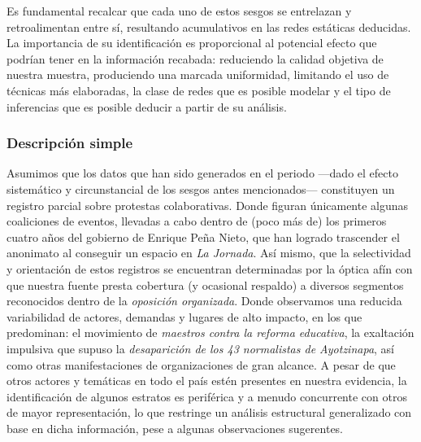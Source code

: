 \documentclass[letterpaper, 11pt]{book}
\theoremstyle{definition}
\theoremstyle{remark}
\begin{document}
Es fundamental recalcar que cada uno de estos sesgos se entrelazan y retroalimentan entre sí, resultando acumulativos en las redes estáticas deducidas. 
La importancia de su identificación es proporcional al potencial efecto que podrían tener en la información recabada: reduciendo la calidad objetiva de nuestra muestra, produciendo una marcada uniformidad, limitando el uso de técnicas más elaboradas, la clase de redes que es posible modelar y el tipo de inferencias que es posible deducir a partir de su análisis. 



\subsubsection{Descripción simple}
\label{subsub_conclusion_dataInterpreta}


Asumimos que los datos que han sido generados en el periodo ---dado el efecto sistemático y circunstancial de los sesgos antes mencionados--- constituyen un registro parcial sobre protestas colaborativas. 
Donde figuran únicamente algunas coaliciones de eventos, llevadas a cabo dentro de (poco más de) los primeros cuatro años del gobierno de Enrique Peña Nieto, que han logrado trascender el anonimato al conseguir un espacio en \emph{La Jornada}. 
Así mismo, que la selectividad y orientación de estos registros se encuentran determinadas por la óptica afín con que nuestra fuente presta cobertura (y ocasional respaldo) a diversos segmentos reconocidos dentro de la \emph{oposición organizada}. 
Donde observamos una reducida variabilidad de actores, demandas y lugares de alto impacto, en los que predominan: el movimiento de \emph{maestros contra la reforma educativa}, la exaltación impulsiva que supuso la \emph{desaparición de los 43 normalistas de Ayotzinapa}, así como otras manifestaciones de organizaciones de gran alcance. 
A pesar de que otros actores y temáticas en todo el país estén presentes en nuestra evidencia, la identificación de algunos estratos es periférica y a menudo concurrente con otros de mayor representación, lo que restringe un análisis estructural generalizado con base en dicha información, pese a algunas observaciones sugerentes. 
\end{document}
